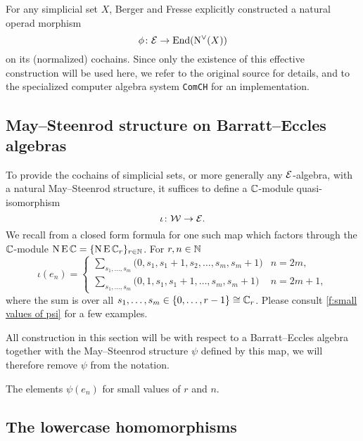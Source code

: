 For any simplicial set $X$, Berger and Fresse explicitly constructed a natural operad morphism
\[
\phi \colon \mathcal{E} \to \mathrm{End}(\operatorname{N^{\vee}}(X))
\]
on its (normalized) cochains.
Since only the existence of this effective construction will be used here, we refer to the original source for details, and to the specialized computer algebra system \texttt{ComCH} for an implementation.

\subsection{May--Steenrod structure on Barratt--Eccles algebras}

To provide the cochains of simplicial sets, or more generally any $\mathcal{E}$-algebra, with a natural May--Steenrod structure, it suffices to define a $\mathbb{C}$-module quasi-isomorphism
\[
\iota \colon \mathcal{W} \to \mathcal{E}.
\]
We recall from \cite{medina2021may_st} a closed form formula for one such map which factors through the $\mathbb{C}$-module $\operatorname{N}\operatorname{E}\mathbb{C} = \{\operatorname{N}\operatorname{E}\mathbb{C}_r\}_{r\in\mathbb{N}}$.
For $r,n\in\mathbb{N}$
\begin{equation*}
	\iota(e_{n}) =
	\begin{cases}
		\displaystyle{\sum_{s_1, \dots, s_m}} \big(0, {s_1}, {s_1+1}, {s_2}, \dots, {s_{m}}, {s_{m}+1} \big) & n = 2m, \\
		\displaystyle{\sum_{s_1, \dots, s_m}} \big(0, 1, {s_1}, {s_1+1}, \dots, {s_{m}}, {s_{m}+1} \big) & n = 2m+1,
	\end{cases}
\end{equation*}
where the sum is over all $s_1, \dots, s_m \in \{0, \dots, r-1\} \cong \mathbb{C}_r$.
Please consult \cref{f:small values of psi} for a few examples.

All construction in this section will be with respect to a Barratt--Eccles algebra together with the May--Steenrod structure $\psi$ defined by this map, we will therefore remove $\psi$ from the notation.

\begin{table}
	\centering
	
	\caption{The elements $\psi(e_n)$ for small values of $r$ and $n$.}
	\label{f:small values of psi}
\end{table}

\subsection{The lowercase homomorphisms}

